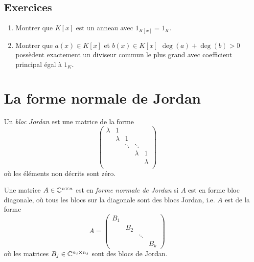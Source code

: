 \subsection*{Exercices}
\label{sec:exercices}
\begin{enumerate}
\item Montrer que $K[x]$ est un anneau avec $1_{K[x]} = 1_K$.  
\item Montrer que  $a(x) \in K[x]$ et $b(x) \in K[x]$ $\deg(a)+\deg(b)>0$  possèdent exactement un diviseur commun le plus grand avec coefficient principal égal à $1_K$.  
\end{enumerate}



\section{La forme normale de Jordan}
\label{sec:la-forme-normale}



\begin{definition}
  Un \emph{bloc Jordan} est une matrice de la forme 
  \begin{displaymath}
    \begin{pmatrix}
      λ & 1 \\
        & λ & 1 \\
        &   & \ddots & \ddots \\ 
        &   &             & λ & 1 \\
        &   &         &  & λ  \\
    \end{pmatrix}
  \end{displaymath}
où les éléments non décrits sont zéro. 

Une matrice $A \in \mathbb{C}^{n \times n}$ est en \emph{forme normale de Jordan} si $A$ est en forme bloc diagonale, où tous les blocs sur la diagonale sont des blocs Jordan, i.e. $A$ est de la forme
\begin{displaymath}
  A =
  \begin{pmatrix}
    B_1 \\
        & B_2 \\
        &    & \ddots \\
        &    &       & B_k
  \end{pmatrix}
\end{displaymath}
où les matrices $B_j \in \mathbb{C}^{n_j\times n_j}$ sont des blocs de Jordan. 
\end{definition}


